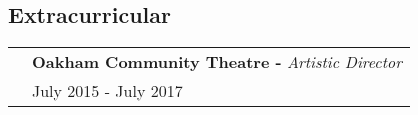 \documentclass[a4paper, oneside, final]{scrartcl} %
\newcommand{\gray}{\rowcolor[gray]{.90}} %
\begin{document}
\begin{center}


  \vspace{-0.3cm}
  \section{Extracurricular}
  \renewcommand{\arraystretch}{1.3}
  \vspace{-0.05cm}

%
%

  \renewcommand{\arraystretch}{1.3}
  \vspace{-0.05cm}

  \begin{tabularx}{1.00\linewidth}{>{\raggedleft\scshape}p{0cm}X}
    \gray& \textbf{Oakham Community Theatre -} \textit{Artistic Director}\\
    \gray& {July 2015 - July 2017}\\
  \end{tabularx}
  \vspace{-0.2cm}
  \begin{itemize} \itemsep-0.2cm
      \vspace{-0.1cm}


\end{itemize}
\end{center}
\end{document}
